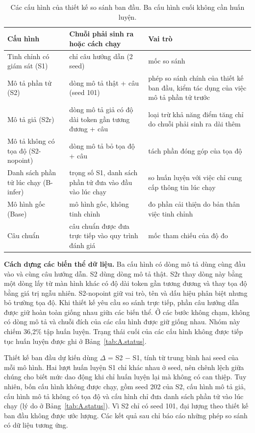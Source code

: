 \begin{table}[htbp]
\centering\small
\caption[Các cấu hình của thiết kế so sánh ban đầu.]{Các cấu hình của thiết kế so sánh ban đầu. Ba cấu hình cuối không cần huấn luyện.}\label{tab:A.1}
\setlength{\tabcolsep}{4pt}
\begin{tabularx}{\textwidth}{@{}>{\raggedright\arraybackslash\hsize=0.62\hsize}X>{\raggedright\arraybackslash\hsize=0.95\hsize}X>{\raggedright\arraybackslash\hsize=1.43\hsize}X@{}}
\toprule
\textbf{Cấu hình} & \textbf{Chuỗi phải sinh ra hoặc cách chạy} & \textbf{Vai trò} \\
\midrule
Tinh chỉnh có giám sát (S1) & chỉ câu hướng dẫn (2 seed) & mốc so sánh \\
Mô tả phần tử (S2) & dòng mô tả thật + câu (seed 101) & phép so sánh chính của thiết kế ban đầu, kiểm tác dụng của việc mô tả phần tử trước \\
Mô tả giả (S2r) & dòng mô tả giả có độ dài token gần tương đương + câu & loại trừ khả năng điểm tăng chỉ do chuỗi phải sinh ra dài thêm \\
Mô tả không có tọa độ (S2-nopoint) & dòng mô tả bỏ tọa độ + câu & tách phần đóng góp của tọa độ \\
Danh sách phần tử lúc chạy (B-infer) & trọng số S1, danh sách phần tử đưa vào đầu vào lúc chạy & so huấn luyện với việc chỉ cung cấp thông tin lúc chạy \\
Mô hình gốc (Base) & mô hình gốc, không tinh chỉnh & đo phần cải thiện do bản thân việc tinh chỉnh \\
Câu chuẩn & câu chuẩn được đưa trực tiếp vào quy trình đánh giá & mốc tham chiếu của độ đo \\
\bottomrule
\end{tabularx}
\end{table}

\textbf{Cách dựng các biến thể dữ liệu.} Ba cấu hình có dòng mô tả dùng cùng đầu vào và cùng câu hướng dẫn. S2 dùng dòng mô tả thật. S2r thay dòng này bằng một dòng lấy từ màn hình khác có độ dài token gần tương đương và thay tọa độ bằng giá trị ngẫu nhiên. S2-nopoint giữ vai trò, tên và dấu hiệu phân biệt nhưng bỏ trường tọa độ. Khi thiết kế yêu cầu so sánh trực tiếp, phần câu hướng dẫn được giữ hoàn toàn giống nhau giữa các biến thể. Ở các bước không chạm, không có dòng mô tả và chuỗi đích của các cấu hình được giữ giống nhau. Nhóm này chiếm 36,2\% tập huấn luyện. Trạng thái cuối của các cấu hình không được tiếp tục huấn luyện được ghi ở Bảng~\ref{tab:A.status}.

Thiết kế ban đầu dự kiến dùng $\Delta$ = S2 $-$ S1, tính từ trung bình hai seed của mỗi mô hình. Hai lượt huấn luyện S1 chỉ khác nhau ở seed, nên chênh lệch giữa chúng cho biết mức dao động khi chỉ huấn luyện lại mà không có can thiệp. Tuy nhiên, bốn cấu hình không được chạy, gồm seed 202 của S2, cấu hình mô tả giả, cấu hình mô tả không có tọa độ và cấu hình chỉ đưa danh sách phần tử vào lúc chạy (lý do ở Bảng~\ref{tab:A.status}). Vì S2 chỉ có seed 101, đại lượng theo thiết kế ban đầu không được ước lượng. Các kết quả sau chỉ báo cáo những phép so sánh có dữ liệu tương ứng.

